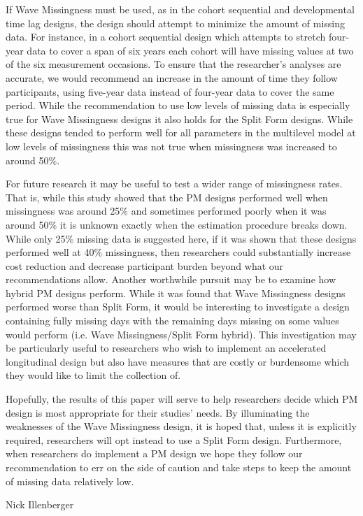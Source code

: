 \documentclass{svjour3}\usepackage[]{graphicx}\usepackage[]{color}
\begin{document}
If Wave Missingness must be used, as in the cohort sequential and developmental time lag designs, the design should attempt to minimize the amount of missing data. For instance, in a cohort sequential design which attempts to stretch four-year data to cover a span of six years each cohort will have missing values at two of the six measurement occasions.  To ensure that the researcher's analyses are accurate, we would recommend an increase in the amount of time they follow participants, using five-year data instead of four-year data to cover the same period. While the recommendation to use low levels of missing data is especially true for Wave Missingness designs it also holds for the Split Form designs. While these designs tended to perform well for all parameters in the multilevel model at low levels of missingness this was not true when missingness was increased to around 50\%. \par

For future research it may be useful to test a wider range of missingness rates. That is, while this study showed that the PM designs performed well when missingness was around 25\% and sometimes performed poorly when it was around 50\% it is unknown exactly when the estimation procedure breaks down. While only 25\% missing data is suggested here, if it was shown that these designs performed well at 40\% missingness, then researchers could substantially increase cost reduction and decrease participant burden beyond what our recommendations allow. Another worthwhile pursuit may be to examine how hybrid PM designs perform. While it was found that Wave Missingness designs performed worse than Split Form, it would be interesting to investigate a design containing fully missing days with the remaining days missing on some values would perform (i.e. Wave Missingness/Split Form hybrid). This investigation may be particularly useful to researchers who wish to implement an accelerated longitudinal design but also have measures that are costly or burdensome which they would like to limit the collection of. \par


Hopefully, the results of this paper will serve to help researchers decide which PM design is most appropriate for their studies' needs. By illuminating the weaknesses of the Wave Missingness design, it is hoped that, unless it is explicitly required, researchers will opt instead to use a Split Form design. Furthermore, when researchers do implement a PM design we hope they follow our recommendation to err on the side of caution and take steps to keep the amount of missing data relatively low. \par


\begin{acknowledgements}
Nick Illenberger
\end{acknowledgements}


\end{document}
